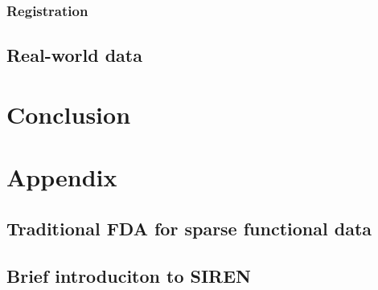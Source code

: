 \documentclass{article}
\begin{document}
\subsubsection{Registration}

\subsection{Real-world data}

\section{Conclusion}

\section{Appendix}

\subsection{Traditional FDA for sparse functional data}

\subsection{Brief introduciton to SIREN}




\end{document}
